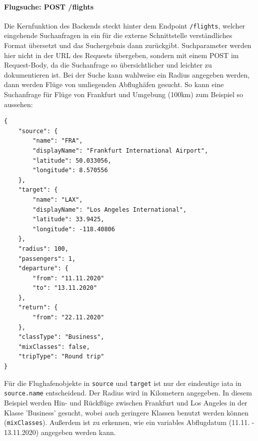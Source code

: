 \documentclass[12pt,twoside,a4paper]{article}
\begin{document}
\begin{sloppypar}
\paragraph[Flugsuche]{Flugsuche: POST /flights}
Die Kernfunktion des Backends steckt hinter dem Endpoint \texttt{/flights}, welcher eingehende Suchanfragen in ein für die externe Schnittstelle verständliches Format übersetzt und das Suchergebnis dann zurückgibt. Suchparameter werden hier nicht in der URL des Requests übergeben, sondern mit einem POST im Request-Body, da die Suchanfrage so übersichtlicher und leichter zu dokumentieren ist. Bei der Suche kann wahlweise ein Radius angegeben werden, dann werden Flüge von umliegenden Abflughäfen gesucht.
\newpage
So kann eine Suchanfrage für Flüge von Frankfurt und Umgebung (100km) zum Beispiel so aussehen:
\begin{Verbatim}
{
	"source": {
		"name": "FRA",
		"displayName": "Frankfurt International Airport",
		"latitude": 50.033056,
		"longitude": 8.570556
	},
	"target": {
		"name": "LAX",
		"displayName": "Los Angeles International",
		"latitude": 33.9425,
		"longitude": -118.40806
	},
	"radius": 100,
	"passengers": 1,
	"departure": {
		"from": "11.11.2020"
		"to": "13.11.2020"
	},
	"return": {
		"from": "22.11.2020"
	},
	"classType": "Business",
	"mixClasses": false,
	"tripType": "Round trip"
}
\end{Verbatim}
Für die Flughafenobjekte in \texttt{source} und \texttt{target} ist nur der eindeutige \acrlong{iata} in \texttt{source.name} entscheidend. Der Radius wird in Kilometern angegeben. In diesem Beispiel werden Hin- und Rückflüge zwischen Frankfurt und Los Angeles in der Klasse 'Business' gesucht, wobei auch geringere Klassen benutzt werden können (\texttt{mixClasses}). Außerdem ist zu erkennen, wie ein variables Abflugdatum (11.11. - 13.11.2020) angegeben werden kann.

\end{sloppypar}
\end{document}
